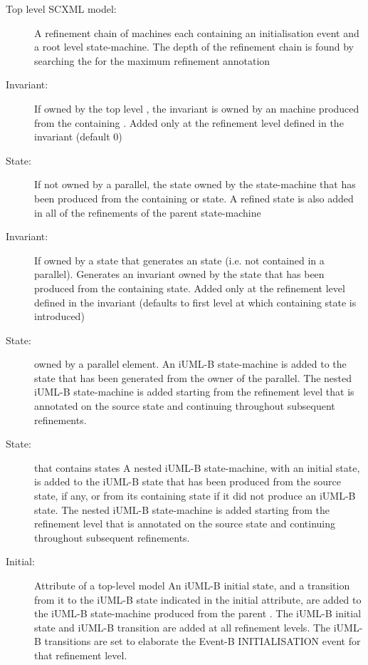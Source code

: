 \begin{description}
\item[Top level SCXML model:] A refinement chain of \EventB machines each containing an initialisation event and a root level \iUMLB state-machine. The depth of the refinement chain is found by searching the \SCXML for the maximum refinement annotation

\item[Invariant:] If owned by the top level \SCXML, the 
invariant is owned by an \EventB machine produced from the containing \SCXML. Added only at the refinement level defined in the invariant (default 0) 

\item[State:] If not owned by a parallel, the state owned by the \iUMLB state-machine that has been produced from the containing \SCXML or state. A refined state is also added in all of the refinements of the parent \iUMLB state-machine

\item[Invariant:] If owned by a state that generates an \iUMLB state (i.e. not contained in a parallel). Generates an invariant owned by the \iUMLB state that has been produced from the containing \SCXML state. Added only at the refinement level defined in the invariant (defaults to first level at which containing \iUMLB state is introduced)

\item[State:] owned by a parallel element. An iUML-B state-machine is added to the state that has been generated from the owner of the parallel. The nested iUML-B state-machine is added starting from the refinement level that is annotated on the source state and continuing throughout subsequent refinements.

\item[State:] that contains states A nested iUML-B state-machine, with an initial state, is added to the iUML-B state that has been produced from the source state, if any, or from its containing state if it did not produce an iUML-B state. The nested iUML-B state-machine is added starting from the refinement level that is annotated on the source state and continuing throughout subsequent refinements.

\item[Initial:] Attribute of a top-level \SCXML model An iUML-B initial state, and a transition from it to the iUML-B state indicated in the \SCXML initial attribute, are added to the iUML-B state-machine produced from the parent \SCXML. The iUML-B initial state and iUML-B transition are added at all refinement levels. The iUML-B transitions are set to elaborate the Event-B INITIALISATION event for that refinement level.


\end{description}
